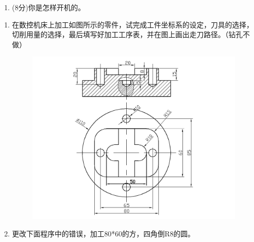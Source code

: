 \documentclass{HUNNUexam}
\begin{document}
\begin{enumerate} [1.]
{		      1、使用急停；

		      2、使用复位；

		      3、进给保持；

		      4、机床电源；
	      }
	\item (8分)你是怎样开机的。
\end{enumerate}
\newpage
\begin{enumerate} [1.]
	\item 在数控机床上加工如图所示的零件，试完成工件坐标系的设定，刀具的选择，切削用量的选择，最后填写好加工工序表，并在图上画出走刀路径。（钻孔不做）
	      \begin{figure}[pht]
		      \centering
		      \includegraphics[width=0.5\linewidth]{figures/1.jpg}
		      \label{fig:3}
	      \end{figure}
	      \newpage
	\item 更改下面程序中的错误，加工80*60的方，四角倒R8的圆。
\end{enumerate}
\end{document}

